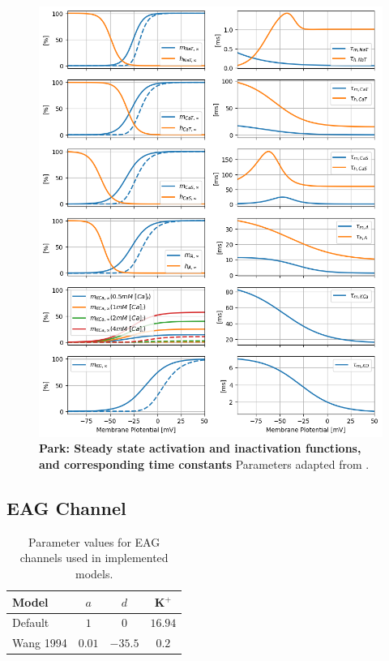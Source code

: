 \documentclass[../main.tex]{subfiles}
\begin{document}
\begin{figure}[!t]
    \centering
    \includegraphics[width=\linewidth]{../img/model_kinetics/goldman.png}
    \caption[Park: Steady state activation and inactivation functions, and corresponding time constants]{
        \textbf{Park: Steady state activation and inactivation functions, and corresponding time constants} Parameters adapted from \parencite{parkMathematicalModelSubthalamic2021}.
    }
    \label{fig:kinetic_plots_park}
\end{figure}



\subsection{EAG Channel} \label{appendix:parameters_eag_channel}

\begin{table}[H]
    \centering
    \begin{tabular}{|l||c|c|c|}
    \hline
    \textbf{Model} & $a$ & $d$ & K$^+$ \\
    \hline
    \hline
    Default \parencite{bronkRegulationEagCa22018}  & $1$       & $0$        & $16.94$ \\
    Wang 1994     & $0.01$    & $-35.5$    & $0.2$  \\
    \hline
    \end{tabular}
    \caption{Parameter values for EAG channels used in implemented models.}
    \label{tab:eag_parameters}
\end{table}
\end{document}
